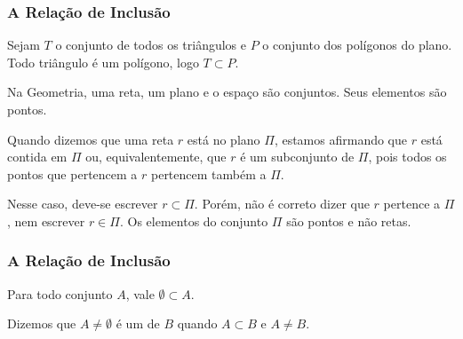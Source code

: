 \documentclass[brazil, notheorems, 10pt]{beamer}
\begin{document}

\begin{frame}
\frametitle{A Relação de Inclusão} %

\begin{Exem}
Sejam $T$ o conjunto de todos os triângulos e $P$ o conjunto dos
polígonos do plano. Todo triângulo é um polígono, logo $ T \subset
P$.
\end{Exem}

\begin{Exem}
Na Geometria, uma reta, um plano e o espaço são conjuntos. Seus
elementos são pontos.

Quando dizemos que uma reta $r$ está no plano $\Pi$, estamos
afirmando que $r$ está contida em $\Pi$ ou, equivalentemente, que
$r$ é um subconjunto de $\Pi$, pois todos os pontos que pertencem a
$r$ pertencem também a $\Pi$.

Nesse caso, deve-se escrever $ r \subset \Pi$. Porém, não é correto
dizer que $r$ pertence a $\Pi$, nem escrever $r \in \Pi$. Os
elementos do conjunto $\Pi$ são pontos e não retas.
\end{Exem}

\end{frame}



\begin{frame}
\frametitle{A Relação de Inclusão} %

\begin{Prop}
Para todo conjunto $A$, vale $\emptyset \subset A$.
\end{Prop}

\begin{Def}
Dizemos que $A \neq \emptyset$ é um  de $B$
quando $A \subset B$  e $A \neq B$.
\end{Def}



\end{frame}


\end{document}
